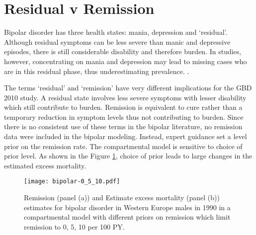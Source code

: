 \section{Residual v Remission}
Bipolar disorder has three health states: mania, depression and
`residual'.  Although residual symptoms can be less severe than manic
and depressive episodes, there is still considerable disability and
therefore burden.  In studies, however, concentrating on mania and
depression may lead to missing cases who are in this residual phase,
thus underestimating prevalence. \cite{angst_historical_2000}.

The terms `residual' and `remission' have very different implications
for the GBD 2010 study.  A residual state involves less severe
symptoms with lesser disability which still contribute to
burden. Remission is equivalent to cure rather than a temporary
reduction in symptom levels thus not contributing to burden. Since
there is no consistent use of these terms in the bipolar literature,
no remission data were included in the bipolar modeling. Instead,
expert guidance set a level prior on the remission rate.  The
compartmental model is sensitive to choice of prior level.  As shown
in the Figure \ref{fig:app-bipolar remission}, choice of prior leads
to large changes in the estimated excess mortality.

    \begin{figure}[h]
        \begin{center}
            \texttt{[image: bipolar-0\_5\_10.pdf]}
            \caption{Remission (panel (a)) and Estimate excess
              mortality (panel (b)) estimates for bipolar disorder in
              Western Europe males in 1990 in a compartmental model
              with different priors on remission which limit remission
              to 0, 5, 10 per 100 PY.}
            \label{fig:app-bipolar remission}
        \end{center}
    \end{figure}

